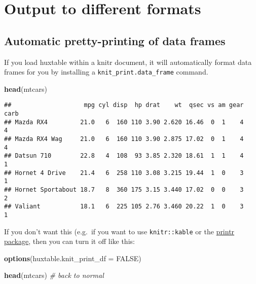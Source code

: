 \documentclass[]{article}
\newenvironment{Shaded}{\begin{snugshade}}{\end{snugshade}}
\newcommand{\CommentTok}[1]{\textcolor[rgb]{0.56,0.35,0.01}{\textit{#1}}}
\newcommand{\DataTypeTok}[1]{\textcolor[rgb]{0.13,0.29,0.53}{#1}}
\newcommand{\KeywordTok}[1]{\textcolor[rgb]{0.13,0.29,0.53}{\textbf{#1}}}
\newcommand{\NormalTok}[1]{#1}
\newcommand{\OtherTok}[1]{\textcolor[rgb]{0.56,0.35,0.01}{#1}}
\begin{document}
\hypertarget{output-to-different-formats}{%
\section{Output to different
formats}\label{output-to-different-formats}}

\hypertarget{automatic-pretty-printing-of-data-frames}{%
\subsection{Automatic pretty-printing of data
frames}\label{automatic-pretty-printing-of-data-frames}}

If you load huxtable within a knitr document, it will automatically
format data frames for you by installing a
\texttt{knit\_print.data\_frame} command.

\FloatBarrier

\begin{Shaded}
\begin{Highlighting}[]
\KeywordTok{head}\NormalTok{(mtcars)}
\end{Highlighting}
\end{Shaded}

\begin{verbatim}
##                    mpg cyl disp  hp drat    wt  qsec vs am gear carb
## Mazda RX4         21.0   6  160 110 3.90 2.620 16.46  0  1    4    4
## Mazda RX4 Wag     21.0   6  160 110 3.90 2.875 17.02  0  1    4    4
## Datsun 710        22.8   4  108  93 3.85 2.320 18.61  1  1    4    1
## Hornet 4 Drive    21.4   6  258 110 3.08 3.215 19.44  1  0    3    1
## Hornet Sportabout 18.7   8  360 175 3.15 3.440 17.02  0  0    3    2
## Valiant           18.1   6  225 105 2.76 3.460 20.22  1  0    3    1
\end{verbatim}

\FloatBarrier

If you don't want this (e.g.~if you want to use \texttt{knitr::kable} or
the
\href{https://cran.r-project.org/web/packages/printr/vignettes/printr.html}{printr
package}, then you can turn it off like this:

\begin{Shaded}
\begin{Highlighting}[]
\KeywordTok{options}\NormalTok{(}\DataTypeTok{huxtable.knit_print_df =} \OtherTok{FALSE}\NormalTok{)}

\KeywordTok{head}\NormalTok{(mtcars) }\CommentTok{# back to normal}
\end{Highlighting}
\end{Shaded}
\end{document}
